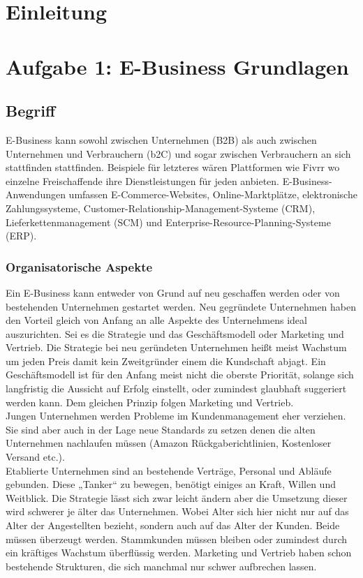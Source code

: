 \documentclass[notitlepage, hidelinks]{article}
\begin{document}
\thispagestyle{empty}
\clearpage
\newpage
\tableofcontents
\thispagestyle{empty}
\clearpage

\normalsize
{}


\section{Einleitung}

\section{Aufgabe 1: E-Business Grundlagen}

\subsection{Begriff}

E-Business kann sowohl zwischen Unternehmen (B2B) als auch zwischen Unternehmen und Verbrauchern (b2C) und sogar zwischen Verbrauchern an sich stattfinden stattfinden. Beispiele für letzteres wären Plattformen wie Fivrr wo einzelne Freischaffende ihre Dienstleistungen für jeden anbieten.
E-Business-Anwendungen umfassen E-Commerce-Websites, Online-Marktplätze, elektronische Zahlungssysteme, Customer-Relationship-Management-Systeme (CRM), Lieferkettenmanagement (SCM) und Enterprise-Resource-Planning-Systeme (ERP).

\subsubsection{Organisatorische Aspekte}
Ein E-Business kann entweder von Grund auf neu geschaffen werden oder von bestehenden Unternehmen gestartet werden. Neu gegründete Unternehmen haben den Vorteil gleich von Anfang an alle Aspekte des Unternehmens ideal auszurichten. Sei es die Strategie und das Geschäftsmodell oder Marketing und Vertrieb. Die Strategie bei neu geründeten Unternehmen heißt meist Wachstum um jeden Preis damit kein Zweitgründer einem die Kundschaft abjagt. Ein Geschäftsmodell ist für den Anfang meist nicht die oberste Priorität, solange sich langfristig die Aussicht auf Erfolg einstellt, oder zumindest glaubhaft suggeriert werden kann. Dem gleichen Prinzip folgen Marketing und Vertrieb. \\
Jungen Unternehmen werden Probleme im Kundenmanagement eher verziehen. Sie sind aber auch in der Lage neue Standards zu setzen denen die alten Unternehmen nachlaufen müssen (Amazon Rückgaberichtlinien, Kostenloser Versand etc.). \\
Etablierte Unternehmen sind an bestehende Verträge, Personal und Abläufe gebunden. Diese „Tanker“ zu bewegen, benötigt einiges an Kraft, Willen und Weitblick. Die Strategie lässt sich zwar leicht ändern aber die Umsetzung dieser wird schwerer je älter das Unternehmen. Wobei Alter sich hier nicht nur auf das Alter der Angestellten bezieht, sondern auch auf das Alter der Kunden. Beide müssen überzeugt werden. Stammkunden müssen bleiben oder zumindest durch ein kräftiges Wachstum überflüssig werden. Marketing und Vertrieb haben schon bestehende Strukturen, die sich manchmal nur schwer aufbrechen lassen. 
\end{document}
